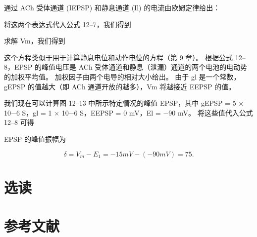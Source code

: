 通过 ACh 受体通道 (IEPSP) 和静息通道 (Il) 的电流由欧姆定律给出：

将这两个表达式代入公式 12–7，我们得到

求解 Vm，我们得到

这个方程类似于用于计算静息电位和动作电位的方程（第 9 章）。 根据公式 12–8，EPSP 的峰值电压是 ACh 受体通道和静息（泄漏）通道的两个电池的电动势的加权平均值。 加权因子由两个电导的相对大小给出。 由于 gl 是一个常数，gEPSP 的值越大（即 ACh 通道开放的越多），Vm 将越接近 EEPSP 的值。

我们现在可以计算图 12–13 中所示特定情况的峰值 EPSP，其中 gEPSP = 5 × 10−6 S，gl = 1 × 10−6 S，EEPSP = 0 mV，El = −90 mV。 将这些值代入公式 12–8 可得

EPSP 的峰值振幅为

\begin{equation}\label{peak_amplitude}
	\delta = V_m - E_1 = -15mV - (-90mV) = 75.
\end{equation}



\section{选读}

\section{参考文献}